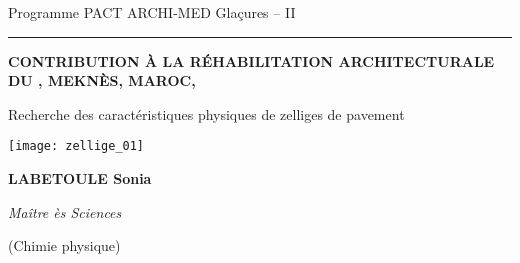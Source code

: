 
\begin{center}
\thispagestyle{empty}

{\LARGE
Programme PACT ARCHI-MED Glaçures -- II\par
}


\rule{.5\textwidth}{1pt}


{\bfseries\huge
\MakeUppercase{Contribution à la réhabilitation architecturale du 
\PaM, Meknès, Maroc, }

\bigskip

Recherche des caractéristiques physiques de zelliges de pavement
}

\vfill

\texttt{[image: zellige\_01]}

\vfill

\textbf{\Large LABETOULE Sonia}

{\itshape
Maître ès Sciences \par
(Chimie physique) \par
}

\vfill

\end{center}



















